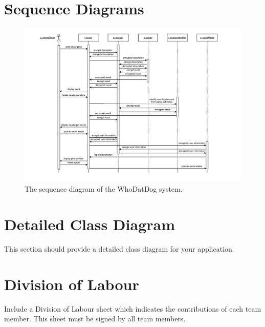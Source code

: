 \documentclass[]{article}
\begin{document}
\section{Sequence Diagrams}
\label{sec:sequence_diagrams}
\begin{figure}[H]
	\centering
	\includegraphics[width=\textwidth]{sequencediagram.pdf}
	\caption{\label{fig:analysisclassdiagram}The sequence diagram of the WhoDatDog system.}
\end{figure}

\section{Detailed Class Diagram}
\label{sec:detailed_class_diagram}
This section should provide a detailed class diagram for your application.

\appendix
\section{Division of Labour}
\label{sec:division_of_labour}
Include a Division of Labour sheet which indicates the contributions of each team member. This sheet must be signed by all team members.

\newpage
\end{document}
